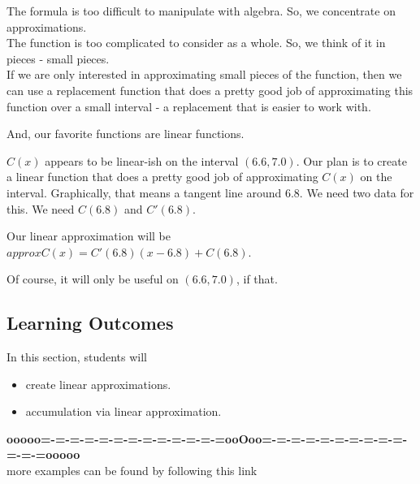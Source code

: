\documentclass{ximera}
\begin{document}
The formula is too difficult to manipulate with algebra.  So, we concentrate on approximations. \\ 


The function is too complicated to consider as a whole. So, we think of it in pieces - small pieces. \\






If we are only interested in approximating small pieces of the function, then we can use a replacement function that does a pretty good job of approximating this function over a small interval - a replacement that is easier to work with.

And, our favorite functions are linear functions.


$C(x)$ appears to be linear-ish on the interval $(6.6, 7.0)$. Our plan is to create a linear function that does a pretty good job of approximating $C(x)$ on the interval. Graphically, that means a tangent line around $6.8$.  We need two data for this.  We need $C(6.8)$ and $C'(6.8)$.





Our linear approximation will be $approxC(x) = C'(6.8)(x-6.8) + C(6.8)$.

Of course, it will only be useful on $(6.6, 7.0)$, if that.






\subsection{Learning Outcomes}


\begin{sectionOutcomes}
In this section, students will 

\begin{itemize}
\item create linear approximations.
\item accumulation via linear approximation.
\end{itemize}
\end{sectionOutcomes}










\begin{center}
\textbf{\textcolor{green!50!black}{ooooo=-=-=-=-=-=-=-=-=-=-=-=-=ooOoo=-=-=-=-=-=-=-=-=-=-=-=-=ooooo}} \\

more examples can be found by following this link\\ 

\end{center}
\end{document}

